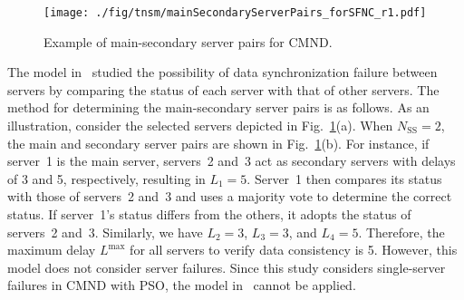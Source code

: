 \documentclass[10pt, letterpaper]{IEEEtran}
\begin{document}
\begin{CJK}{UTF8}{ipxm}
\begin{figure}[tb]
  \begin{center}
    \texttt{[image: ./fig/tnsm/mainSecondaryServerPairs\_forSFNC\_r1.pdf]}
  \end{center}
  \caption{Example of main-secondary server pairs for CMND.}
  \label{fig:mainSecondaryServerPairs}
\end{figure}

The model in~\cite{KawabataICC2023,CMND} studied the possibility of data synchronization failure between servers 
by comparing the status of each server with that of other servers.
The method for determining the main-secondary server pairs is as follows.
As an illustration, consider the selected servers depicted in Fig.~\ref{fig:mainSecondaryServerPairs}(a). When $N_{\mathrm{SS}}=2$, the main and secondary server pairs are shown in Fig.~\ref{fig:mainSecondaryServerPairs}(b). 
For instance, if server~1 is the main server, servers~2 and~3 act as secondary servers with delays of 3 and 5, respectively, resulting in $L_1=5$. 
Server~1 then compares its status with those of servers~2 and~3 and uses a majority vote to determine the correct status. 
If server~1's status differs from the others, it adopts the status of servers~2 and~3. 
Similarly, we have $L_2=3$, $L_3=3$, and $L_4=5$.
Therefore, the maximum delay $L^{\max}$ for all servers to verify data consistency is 5.
  However, this model does not consider server failures.
  Since this study considers single-server failures in CMND with PSO, the model in~\cite{KawabataICC2023,CMND} cannot be applied.


\end{CJK}
\end{document}
